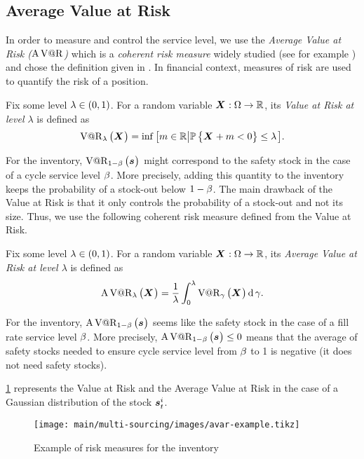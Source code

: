 \subsection{Average Value at Risk}


In order to measure and control the service level, we use the \emph{Average Value at Risk ($\operatorname{A\operatorname{V@R}}$)} which is a \emph{coherent risk measure} widely studied (see for example \citet{Artzner1999,Rockafellar2000,Rockafellar2002}) and chose the definition given in \citet{Follmer2004}.
In financial context, measures of risk are used to quantify the risk of a position.


Fix some level $\lambda\in\bracket{0,1}$. For a random variable $\va X:\scenarios\to\RR$, its \emph{Value at Risk at level $\lambda$} is defined as
\begin{equation}
\VaR_{\lambda}\bracket{\va X} = \inf\sqbracket{m\in\RR\left|\prob\crbracket{\va X+m<0}\le\lambda\right.}.
\end{equation}


For the inventory, $\VaR_{1-\servicelvl}\bracket{\va\inventory}$ might correspond to the safety stock in the case of a cycle service level $\beta$.
More precisely, adding this quantity to the inventory keeps the probability of a stock-out below $1-\beta$.
The main drawback of the Value at Risk is that it only controls the probability of a stock-out and not its size.
Thus, we use the following coherent risk measure defined from the Value at Risk.


Fix some level $\lambda\in\bracket{0,1}$. For a random variable $\va X:\scenarios\to\RR$, its \emph{Average Value at Risk at level $\lambda$} is defined as
\begin{equation}
\AVaR_{\lambda}\bracket{\va X} = \frac{1}{\lambda}\int_0^{\lambda}\VaR_{\gamma}\bracket{\va X}\diff\gamma.
\end{equation}


For the inventory, $\AVaR_{1-\servicelvl}\bracket{\va\inventory}$ seems like the safety stock in the case of a fill rate service level $\beta$.
More precisely, $\AVaR_{1-\servicelvl}\bracket{\va\inventory}\le 0$ means that the average of safety stocks needed to ensure cycle service level from $\beta$ to 1 is negative (\ie it does not need safety stocks).


\cref{fig:avar-examples} represents the Value at Risk and the Average Value at Risk in the case of a Gaussian distribution of the stock $\va\inventory_t^i$.


\begin{figure}[h]
  \centering
  \texttt{[image: main/multi-sourcing/images/avar-example.tikz]}
  \caption{Example of risk measures for the inventory}
  \label{fig:avar-examples}
\end{figure}




